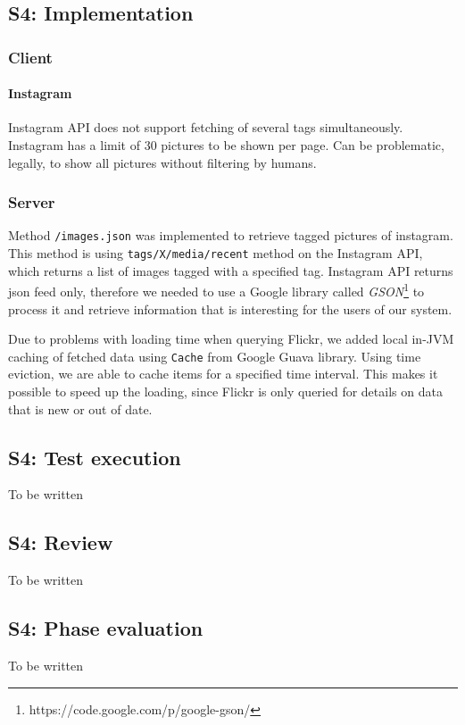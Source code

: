 \documentclass[11pt]{book}
\begin{document}
\subsection{S4: Implementation}

\subsubsection{Client}
\paragraph{Instagram}
Instagram API does not support fetching of several tags simultaneously.
Instagram has a limit of 30 pictures to be shown per page. 
Can be problematic, legally, to show all pictures without filtering by humans.

\subsubsection{Server}

Method \texttt{/images.json} was implemented to retrieve tagged pictures of instagram. This method is using \texttt{tags/X/media/recent} method on the Instagram API, which returns a list of images tagged with a specified tag. Instagram API returns \gls{json} feed only, therefore we needed to use a Google library called \emph{GSON}\footnote{https://code.google.com/p/google-gson/} to process it and retrieve information that is interesting for the users of our system.

Due to problems with loading time when querying Flickr, we added local in-JVM caching of fetched data using \texttt{Cache} from Google Guava library. Using time eviction, we are able to cache items for a specified time interval. This makes it possible to speed up the loading, since Flickr is only queried for details on data that is new or out of date.


\subsection{S4: Test execution}
To be written
\subsection{S4: Review}
To be written
\subsection{S4: Phase evaluation}
To be written
\end{document}
